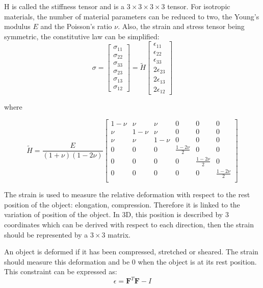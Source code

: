 \documentclass[11pt, oneside, a4paper]{memoir}
\begin{document}
H is called the stiffness tensor and is a $3\times3\times3\times3$ tensor. For isotropic materials, the number of material parameters can be reduced to two, the Young's modulus $E$ and the Poisson's ratio $\nu$. Also, the strain and stress tensor being symmetric, the constitutive law can be simplified:
\begin{equation}
\sigma = 
\begin{bmatrix}
\sigma_{11} \\
\sigma_{22} \\
\sigma_{33} \\
\sigma_{23} \\
\sigma_{13} \\
\sigma_{12}
\end{bmatrix}
=
\tilde{H}
\begin{bmatrix}
\epsilon_{11} \\
\epsilon_{22} \\
\epsilon_{33} \\
2\epsilon_{23} \\
2\epsilon_{13} \\
2\epsilon_{12}
\end{bmatrix}
\end{equation}

where

\begin{equation}
\tilde{H} =
\frac{E}{\left(1+\nu\right)\left(1-2\nu\right)}
\begin{bmatrix}
1-\nu & \nu & \nu & 0 & 0 & 0 \\ 
\nu & 1-\nu & \nu & 0 & 0 & 0 \\
\nu & \nu & 1-\nu & 0 & 0 & 0 \\
0 & 0 & 0 & \frac{1-2\nu}{2} & 0 & 0 \\
0 & 0 & 0 & 0 & \frac{1-2\nu}{2} & 0 \\
0 & 0 & 0 & 0 & 0 & \frac{1-2\nu}{2} \\
\end{bmatrix}
\end{equation}

The strain is used to measure the relative deformation with respect to the rest position of the object: elongation, compression. Therefore it is  linked to the variation of position of the object. In 3D, this position is described by 3 coordinates which can be derived with respect to each direction, then the strain should be represented by a $3\times3$ matrix.

An object is deformed if it has been compressed, stretched or sheared. The strain should measure this deformation and be $0$ when the object is at its rest position. This constraint can be expressed as:
\begin{equation}
\epsilon = \mathbf{F}^{T}\mathbf{F}-I
\end{equation}
\end{document}
